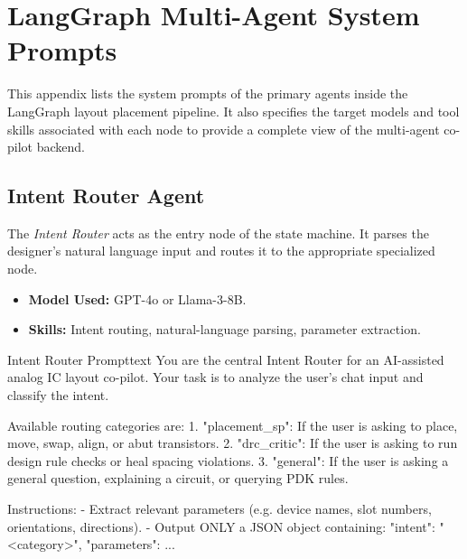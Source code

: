 
\chapter{LangGraph Multi-Agent System Prompts}
\label{app:agent_prompts}

\noindent
This appendix lists the system prompts of the primary agents inside the LangGraph layout placement pipeline. It also specifies the target models and tool skills associated with each node to provide a complete view of the multi-agent co-pilot backend.

\section{Intent Router Agent}
\noindent
The \textit{Intent Router} acts as the entry node of the state machine. It parses the designer's natural language input and routes it to the appropriate specialized node.
\begin{itemize}
    \item \textbf{Model Used:} GPT-4o or Llama-3-8B.
    \item \textbf{Skills:} Intent routing, natural-language parsing, parameter extraction.
\end{itemize}
\begin{thesiscode}{Intent Router Prompt}{text}
You are the central Intent Router for an AI-assisted analog IC layout co-pilot.
Your task is to analyze the user's chat input and classify the intent.

Available routing categories are:
1. "placement_sp": If the user is asking to place, move, swap, align, or abut transistors.
2. "drc_critic": If the user is asking to run design rule checks or heal spacing violations.
3. "general": If the user is asking a general question, explaining a circuit, or querying PDK rules.

Instructions:
- Extract relevant parameters (e.g. device names, slot numbers, orientations, directions).
- Output ONLY a JSON object containing:
  {
    "intent": "<category>",
    "parameters": { ... }
  }
\end{thesiscode}

